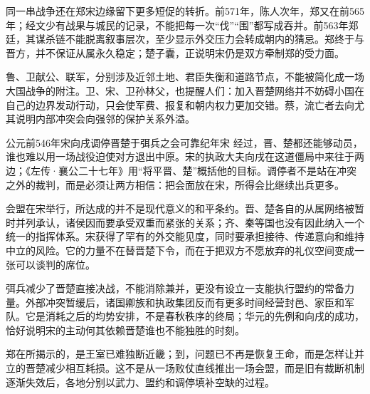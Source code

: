 

同一串战争还在郑宋边缘留下更多短促的转折。前571年，陈人次年，郑又在前565年；经文少有战果与城民的记录，不能把每一次“伐”“围”都写成吞并。前563年郑廷，其谋杀链不能脱离叙事层次，至少显示外交压力会转成朝内的猜忌。郑终于与晋方，并不保证从属永久稳定；楚子囊，正说明宋仍是双方牵制郑的受力面。

鲁、卫献公、联军，分别涉及近邻土地、君臣失衡和道路节点，不能被简化成一场大国战争的附注。卫、宋、卫孙林父，也提醒人们：加入晋楚网络并不妨碍小国在自己的边界发动行动，只会使军费、报复和朝内权力更加交错。蔡，流亡者去向尤其说明内部冲突会向强邻的保护关系外溢。

\begin{event}{公元前546年}{宋向戌调停晋楚于弭兵之会}{可靠纪年}{宋}
经过，晋、楚都还能够动员，谁也难以用一场战役迫使对方退出中原。宋的执政大夫向戌在这道僵局中来往于两边；《左传·襄公二十七年》用“将平晋、楚”概括他的目标。调停者不是站在冲突之外的裁判，而是必须让两方相信：把会面放在宋，所得会比继续出兵更多。

会盟在宋举行，所达成的并不是现代意义的和平条约。晋、楚各自的从属网络被暂时并列承认，诸侯因而要承受双重而紧张的关系；齐、秦等国也没有因此纳入一个统一的指挥体系。宋获得了罕有的外交能见度，同时要承担接待、传递意向和维持中立的风险。它的力量不在替晋楚下令，而在于把双方不愿放弃的礼仪空间变成一张可以谈判的席位。



弭兵减少了晋楚直接决战，不能消除兼并，更没有设立一支能执行盟约的常备力量。外部冲突暂缓后，诸国卿族和执政集团反而有更多时间经营封邑、家臣和军队。它是消耗之后的均势安排，不是春秋秩序的终局；华元的先例和向戌的成功，恰好说明宋的主动何其依赖晋楚谁也不能独胜的时刻。
\end{event}

\begin{causalchain}[从王师败绩到宋地会盟]
郑在所揭示的，是王室已难独断近畿；到，问题已不再是恢复王命，而是怎样让并立的晋楚减少相互耗损。这不是从一场败仗直线推出一场会盟，而是旧有裁断机制逐渐失效后，各地分别以武力、盟约和调停填补空缺的过程。
\end{causalchain}

